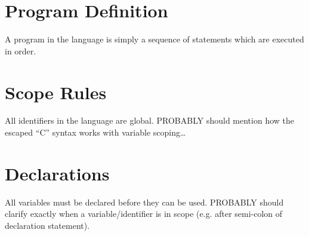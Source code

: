 \section{Program Definition}
A program in the \sys{} language is simply a sequence of statements which
are executed in order.

\section{Scope Rules}
All identifiers in the \sys{} language are global.
PROBABLY should mention how the escaped ``C'' syntax works with variable scoping\ldots

\section{Declarations}
All variables must be declared before they can be used.
PROBABLY should clarify exactly when a variable/identifier is in scope (e.g. after semi-colon of declaration statement).
